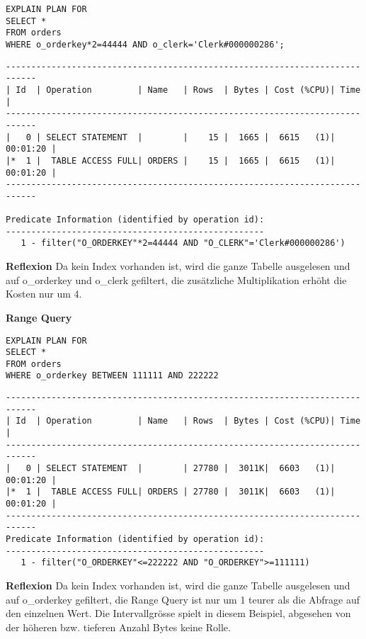 \documentclass[10pt]{article}
\begin{document}
\begin{lstlisting}[style=sql]
EXPLAIN PLAN FOR 
SELECT *
FROM orders
WHERE o_orderkey*2=44444 AND o_clerk='Clerk#000000286';
\end{lstlisting}
\begin{lstlisting}[style=queryexecutionplan]
----------------------------------------------------------------------------
| Id  | Operation         | Name   | Rows  | Bytes | Cost (%CPU)| Time     |
----------------------------------------------------------------------------
|   0 | SELECT STATEMENT  |        |    15 |  1665 |  6615   (1)| 00:01:20 |
|*  1 |  TABLE ACCESS FULL| ORDERS |    15 |  1665 |  6615   (1)| 00:01:20 |
----------------------------------------------------------------------------
 
Predicate Information (identified by operation id):
---------------------------------------------------
   1 - filter("O_ORDERKEY"*2=44444 AND "O_CLERK"='Clerk#000000286')
\end{lstlisting}
\textbf{Reflexion} \newline
Da kein Index vorhanden ist, wird die ganze Tabelle ausgelesen und auf o\_orderkey und o\_clerk gefiltert, die zusätzliche Multiplikation erhöht die Kosten nur um 4.

\textbf{Range Query}
\begin{lstlisting}[style=sqlNoTitle]
EXPLAIN PLAN FOR
SELECT *
FROM orders
WHERE o_orderkey BETWEEN 111111 AND 222222
\end{lstlisting}
\begin{lstlisting}[style=queryexecutionplan]
----------------------------------------------------------------------------
| Id  | Operation         | Name   | Rows  | Bytes | Cost (%CPU)| Time     |
----------------------------------------------------------------------------
|   0 | SELECT STATEMENT  |        | 27780 |  3011K|  6603   (1)| 00:01:20 |
|*  1 |  TABLE ACCESS FULL| ORDERS | 27780 |  3011K|  6603   (1)| 00:01:20 |
----------------------------------------------------------------------------
Predicate Information (identified by operation id):
---------------------------------------------------
   1 - filter("O_ORDERKEY"<=222222 AND "O_ORDERKEY">=111111)
\end{lstlisting}
\textbf{Reflexion} \newline
Da kein Index vorhanden ist, wird die ganze Tabelle ausgelesen und auf o\_orderkey gefiltert, die Range Query ist nur um 1 teurer als die Abfrage auf den einzelnen Wert.
Die Intervallgrösse spielt in diesem Beispiel, abgesehen von der höheren bzw. tieferen Anzahl Bytes keine Rolle.
\end{document}
